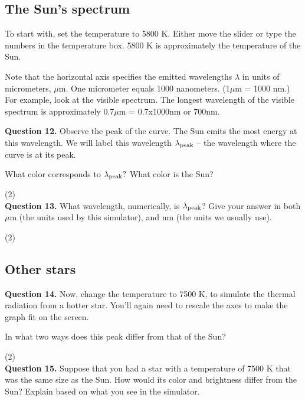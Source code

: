 \documentclass[11pt]{article}
\begin{document}
\subsection{The Sun's spectrum}

To start with, set the temperature to 5800 K.  Either move the slider or type the numbers in the temperature box. 5800 K is approximately the temperature of the Sun.  

Note that the horizontal axis specifies the emitted wavelengths $\lambda$ in units of micrometers, $\mu$m. One micrometer equals 1000 nanometers. (1$\mu$m = 1000 nm.)  For example, look at the visible spectrum.  The longest wavelength of the visible spectrum is approximately 0.7$\mu$m = 0.7x1000nm or 700nm.

{\bf Question 12.} Observe the peak of the curve.  The Sun emits the most energy at this wavelength.  We will label this wavelength $\lambda_{\rm peak}$ -- the wavelength where the curve is at its peak.

What color corresponds to $\lambda_{\rm peak}?$  What color is the Sun?


\vspace{2.5cm}
(2) \hrulefill\\



\textbf {Question 13.} What wavelength, numerically, is $\lambda_{\rm peak}$? Give your answer in both $\mu$m (the units used by this simulator), and nm (the units we usually use).

\vspace{2.5cm}
(2) \hrulefill\\
\newpage
\subsection{Other stars}

\textbf {Question 14.} Now, change the temperature to 7500 K, to simulate the thermal radiation from a hotter star. You'll again need to rescale the axes to make the graph fit on the screen.

In what two ways does this peak differ from that of the Sun?

\vspace{2cm}
(2) \hrulefill\\


\textbf {Question 15.} Suppose that you had a star with a temperature of 7500 K that was the same size as the Sun. How would its color and brightness differ from the Sun? Explain based on what you see in the simulator.
\end{document}
